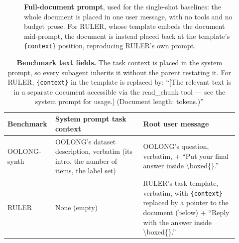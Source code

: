 \begin{figure}[H]

\vspace{2mm}
\caption{\textbf{Full-document prompt}, used for the single-shot baselines: the whole document is placed in one
user message, with no tools and no budget prose. For RULER, whose template embeds the document mid-prompt, the
document is instead placed back at the template's \texttt{\{context\}} position, reproducing RULER's own prompt.}
\label{fig:full-doc-prompt}
\end{figure}

\begin{table}[H]
\centering\small
\begin{tabular}{@{}p{0.15\linewidth}p{0.37\linewidth}p{0.4\linewidth}@{}}
\toprule
Benchmark & System prompt task context & Root user message \\
\midrule
OOLONG-synth & OOLONG's dataset description, verbatim (its intro, the number of items, the label set) &
  OOLONG's question, verbatim, + ``Put your final answer inside \textbackslash{}boxed\{\}.'' \\[0.4em]
RULER & None (empty) & RULER's task template, verbatim, with \texttt{\{context\}} replaced by a pointer to the
  document (below) + ``Reply with the answer inside \textbackslash{}boxed\{\}.'' \\
\bottomrule
\end{tabular}
\caption{\textbf{Benchmark text fields.} The task context is placed in the system prompt, so every
subagent inherits it without the parent restating it. For RULER, \texttt{\{context\}} in the template is replaced
by: ``[The relevant text is in a separate document accessible via the read\_chunk tool --- see the system prompt for
usage.] (Document length:  tokens.)''}
\label{tab:prompt-slots}
\end{table}

